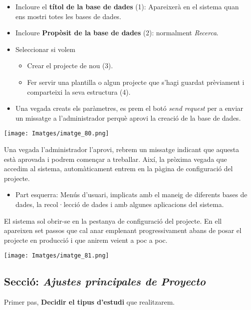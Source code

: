 \documentclass[
]{article}
\providecommand{\tightlist}{%
  \setlength{\itemsep}{0pt}\setlength{\parskip}{0pt}}
\begin{document}
\begin{itemize}
\tightlist
\item
  Incloure el \textbf{títol de la base de dades} (1): Apareixerà en el sistema quan ens mostri totes les bases de dades.
\item
  Incloure \textbf{Propòsit de la base de dades} (2): normalment \emph{Recerca}.
\item
  Seleccionar si volem

  \begin{itemize}
  \tightlist
  \item
    Crear el projecte de nou (3).
  \item
    Fer servir una plantilla o algun projecte que s'hagi guardat prèviament i comparteixi la seva estructura (4).
  \end{itemize}
\item
  Una vegada creats els paràmetres, es prem el botó \emph{send request} per a enviar un missatge a l'administrador perquè aprovi la creació de la base de dades.
\end{itemize}

\texttt{[image: Imatges/imatge\_80.png]}

Una vegada l'administrador l'aprovi, rebrem un missatge indicant que aquesta està aprovada i podrem començar a treballar. Així, la pròxima vegada que accedim al sistema, automàticament entrem en la pàgina de configuració del projecte.

\begin{itemize}
\tightlist
\item
  Part esquerra: Menús d'usuari, implicats amb el maneig de diferents bases de dades, la recol·lecció de dades i amb algunes aplicacions del sistema.
\end{itemize}

El sistema sol obrir-se en la pestanya de configuració del projecte. En ell apareixen set passos que cal anar emplenant progressivament abans de posar el projecte en producció i que anirem veient a poc a poc.

\texttt{[image: Imatges/imatge\_81.png]}

\hypertarget{en4}{%
\subsection{\texorpdfstring{\textbf{Secció:} \emph{Ajustes principales de Proyecto}}{Secció: Ajustes principales de Proyecto}}\label{en4}}

Primer pas, \textbf{Decidir el tipus d'estudi} que realitzarem.
\end{document}
